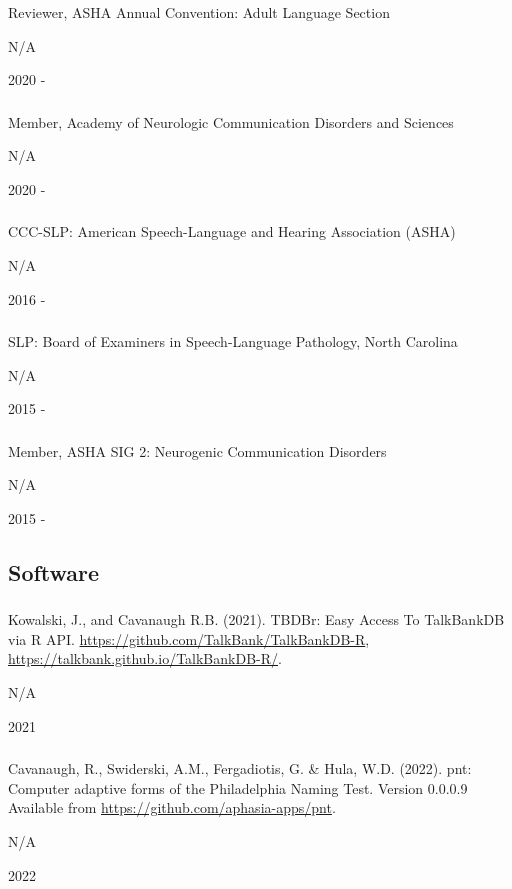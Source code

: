 \documentclass[
]{article}
\begin{document}
Reviewer, ASHA Annual Convention: Adult Language Section

N/A

2020 -

\hypertarget{section-36}{%
\subsubsection{}\label{section-36}}

Member, Academy of Neurologic Communication Disorders and Sciences

N/A

2020 -

\hypertarget{section-37}{%
\subsubsection{}\label{section-37}}

CCC-SLP: American Speech-Language and Hearing Association (ASHA)

N/A

2016 -

\hypertarget{section-38}{%
\subsubsection{}\label{section-38}}

SLP: Board of Examiners in Speech-Language Pathology, North Carolina

N/A

2015 -

\hypertarget{section-39}{%
\subsubsection{}\label{section-39}}

Member, ASHA SIG 2: Neurogenic Communication Disorders

N/A

2015 -

\hypertarget{software}{%
\subsection{Software}\label{software}}

\hypertarget{section-40}{%
\subsubsection{}\label{section-40}}

Kowalski, J., and Cavanaugh R.B. (2021). TBDBr: Easy Access To
TalkBankDB via R API. \url{https://github.com/TalkBank/TalkBankDB-R},
\url{https://talkbank.github.io/TalkBankDB-R/}.

N/A

2021

\hypertarget{section-41}{%
\subsubsection{}\label{section-41}}

Cavanaugh, R., Swiderski, A.M., Fergadiotis, G. \& Hula, W.D. (2022).
pnt: Computer adaptive forms of the Philadelphia Naming Test. Version
0.0.0.9 Available from \url{https://github.com/aphasia-apps/pnt}.

N/A

2022
\end{document}
